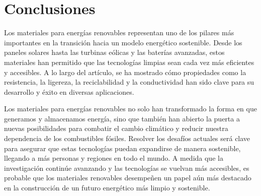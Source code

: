 \documentclass[letterpaper, 12pt]{article}
\begin{document}
\section{Conclusiones}

Los materiales para energías renovables representan uno de los pilares más
importantes en la transición hacia un modelo energético sostenible. Desde los
paneles solares hasta las turbinas eólicas y las baterías avanzadas, estos
materiales han permitido que las tecnologías limpias sean cada vez más
eficientes y accesibles. A lo largo del artículo, se ha mostrado cómo
propiedades como la resistencia, la ligereza, la reciclabilidad y la
conductividad han sido clave para su desarrollo y éxito en diversas
aplicaciones.

Los materiales para energías renovables no solo han transformado la forma en
que generamos y almacenamos energía, sino que también han abierto la puerta a
nuevas posibilidades para combatir el cambio climático y reducir nuestra
dependencia de los combustibles fósiles. Resolver los desafíos actuales será
clave para asegurar que estas tecnologías puedan expandirse de manera
sostenible, llegando a más personas y regiones en todo el mundo. A medida que
la investigación continúe avanzando y las tecnologías se vuelvan más
accesibles, es probable que los materiales renovables desempeñen un papel aún
más destacado en la construcción de un futuro energético más limpio y
sostenible.

\newpage

\printbibliography
\end{document}
